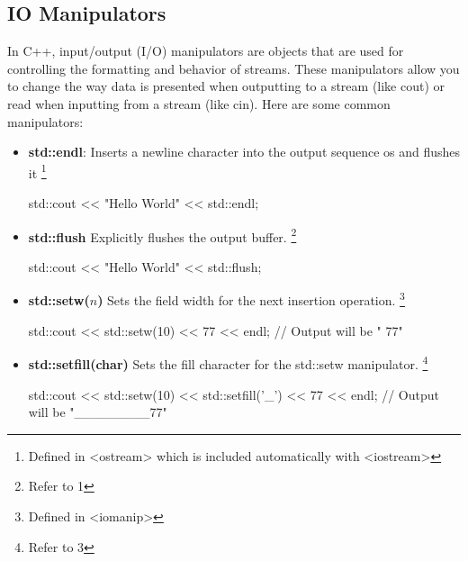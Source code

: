 \documentclass{report}
\begin{document}
    \pagebreak \bigbreak \noindent 
    \subsection{IO Manipulators}
    \bigbreak \noindent 
    In C++, input/output (I/O) manipulators are objects that are used for controlling the formatting and behavior of streams. These manipulators allow you to change the way data is presented when outputting to a stream (like cout) or read when inputting from a stream (like cin).
    \bigbreak \noindent 
    Here are some common manipulators:
    \begin{itemize}
        \item \textbf{std::endl}:  Inserts a newline character into the output sequence os and flushes it \footnote{Defined in <ostream> which is included automatically with <iostream>}
            \smallbreak
            
            \begin{cppcode}
            std::cout << "Hello World" << std::endl;
            \end{cppcode}
            
        \item \textbf{std::flush}  Explicitly flushes the output buffer. \footnote{Refer to 1}
            \smallbreak
            
            \begin{cppcode}
            std::cout << "Hello World" << std::flush;
            \end{cppcode}
            
        \item \textbf{std::setw($n$)} Sets the field width for the next insertion operation. \footnote{Defined in <iomanip>}
            \smallbreak
            
            \begin{cppcode}
            std::cout << std::setw(10) << 77 << endl; 
            // Output will be "        77"
            \end{cppcode}
            
        \item \textbf{std::setfill(char)} Sets the fill character for the std::setw manipulator. \footnote{Refer to 3}
            \smallbreak
            
            \begin{cppcode}
            std::cout << std::setw(10) << std::setfill('_') << 77 << endl; 
            // Output will be "________77"
            \end{cppcode}
            


\end{itemize}
\end{document}
